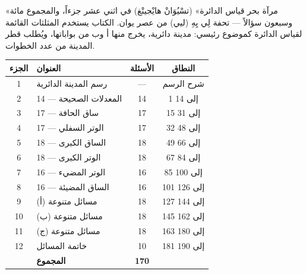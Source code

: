 \documentclass[11pt,a4paper]{article}
\begin{document}
\begin{minipage}[t]{0.48\textwidth}
\arabicfont\beginR
«مرآة بحر قياس الدائرة» (تسْيُوَانْ هايْجينْغ) في اثني عشر جزءاً،
والمجموع مائة وسبعون سؤالاً — تحفة لِي يِهِ (ليي) من عصر يوان.
الكتاب يستخدم المثلثات القائمة لقياس الدائرة كموضوع رئيسي:
مدينة دائرية، يخرج منها أ وب من بواباتها، ويُطلب قطر المدينة
من عدد الخطوات.

\vspace{0.3cm}
\begin{center}
\begin{tabular}{clcc}
\toprule
\textbf{الجزء} & \textbf{العنوان} & \textbf{الأسئلة} & \textbf{النطاق} \\
\midrule
1 & رسم المدينة الدائرية & --- & شرح الرسم \\
2 & المعدلات الصحيحة — 14 & 14 & 1 إلى 14 \\
3 & ساق الحافة — 17 & 17 & 15 إلى 31 \\
\rowcolor{gray!15}
4 & الوتر السفلي — 17 & 17 & 32 إلى 48 \\
\rowcolor{gray!15}
5 & الساق الكبرى — 18 & 18 & 49 إلى 66 \\
\rowcolor{gray!15}
6 & الوتر الكبرى — 18 & 18 & 67 إلى 84 \\
7 & الوتر المضيء — 16 & 16 & 85 إلى 100 \\
8 & الساق المضيئة — 16 & 16 & 101 إلى 126 \\
9 & مسائل متنوعة (أ) & 18 & 127 إلى 144 \\
10 & مسائل متنوعة (ب) & 18 & 145 إلى 162 \\
11 & مسائل متنوعة (ج) & 18 & 163 إلى 180 \\
12 & خاتمة المسائل & 10 & 181 إلى 190 \\
\midrule
 & \textbf{المجموع} & \textbf{170} & \\
\bottomrule
\end{tabular}
\end{center}
\endR
\end{minipage}

\vspace{0.8cm}
\end{document}
